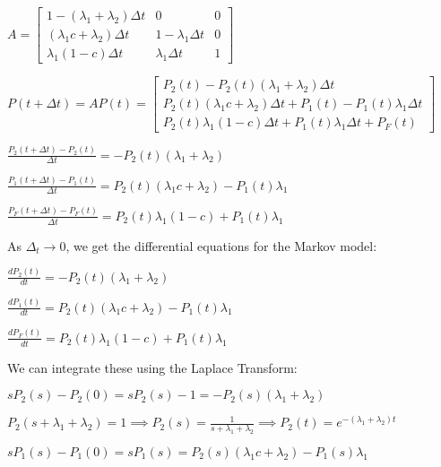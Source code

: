\documentclass[a4paper,12pt]{article}
\begin{document}
\begin{enumerate}
\begin{description}
                    $A = \begin{bmatrix}
                        1 - (\lambda_1 + \lambda_2)\Delta t & 0 & 0 \\
                        (\lambda_1 c + \lambda_2)\Delta t & 1 - \lambda_1\Delta t & 0 \\
                        \lambda_1(1 - c)\Delta t & \lambda_1\Delta t & 1
                    \end{bmatrix}$

                    $P(t + \Delta t) = AP(t) = \begin{bmatrix}
                        P_2(t) - P_2(t)(\lambda_1 + \lambda_2)\Delta t\\
                        P_2(t)(\lambda_1 c + \lambda_2)\Delta t + P_1(t) - P_1(t)\lambda_1\Delta t \\
                        P_2(t)\lambda_1(1 - c)\Delta t + P_1(t)\lambda_1\Delta t + P_F(t)
                    \end{bmatrix}$

                    $\frac{P_2(t + \Delta t) - P_2(t)}{\Delta t} = -P_2(t)(\lambda_1 + \lambda_2)$

                    $\frac{P_1(t + \Delta t) - P_1(t)}{\Delta t} = P_2(t)(\lambda_1 c + \lambda_2) - P_1(t)\lambda_1$

                    $\frac{P_F(t + \Delta t) - P_F(t)}{\Delta t} = P_2(t)\lambda_1(1 - c) + P_1(t)\lambda_1$

                    As $\Delta_t \to 0$, we get the differential equations for the Markov model:

                    $\frac{dP_2(t)}{dt} = -P_2(t)(\lambda_1 + \lambda_2)$

                    $\frac{dP_1(t)}{dt} = P_2(t)(\lambda_1 c + \lambda_2) - P_1(t)\lambda_1$

                    $\frac{dP_F(t)}{dt} = P_2(t)\lambda_1(1 - c) + P_1(t)\lambda_1$

                    We can integrate these using the Laplace Transform:

                    $sP_2(s) - P_2(0) = sP_2(s) - 1 = -P_2(s)(\lambda_1 + \lambda_2)$

                    $P_2(s + \lambda_1 + \lambda_2) = 1 \implies P_2(s) = \frac{1}{s + \lambda_1 + \lambda_2} \implies P_2(t) = e^{-(\lambda_1 + \lambda_2)t}$

                    $sP_1(s) - P_1(0) = sP_1(s) = P_2(s)(\lambda_1c + \lambda_2) - P_1(s)\lambda_1$


\end{description}
\end{enumerate}
\end{document}
